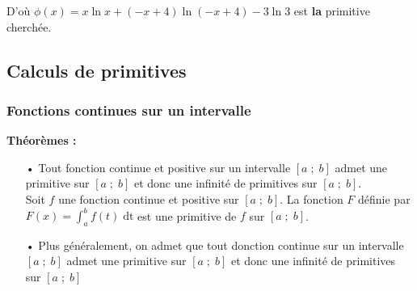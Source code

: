 D'où $\phi\left(x\right) = x\ln x + \left(-x + 4\right)\ln\left(-x + 4\right) - 3\ln 3$ est \textbf{la} primitive cherchée. \\

\newpage

\vspace*{-2cm}

\subsection{Calculs de primitives}

\subsubsection{Fonctions continues sur un intervalle}

\textbf{Théorèmes :} \\

\begin{itemize}
\item[•] Tout fonction continue et positive sur un intervalle $\left[a \; ; \; b\right]$ admet une primitive sur $\left[a \; ; \; b\right]$ et donc une infinité de primitives sur $\left[a \; ; \; b\right]$. \\

Soit $f$ une fonction continue et positive sur $\left[a \; ; \; b \right]$. La fonction $F$ définie par $F\left(x\right) = \displaystyle \int_a^b f(t) \; \mathrm{dt}$ est une primitive de $f$ sur $\left[a \; ; \; b\right]$. \\

\item[•] Plus généralement, on admet que tout donction continue sur un intervalle $\left[a \; ; \; b\right]$ admet une primitive sur $\left[a \; ; \; b\right]$ et donc une infinité de primitives sur $\left[a \; ; \; b\right]$
\end{itemize}


